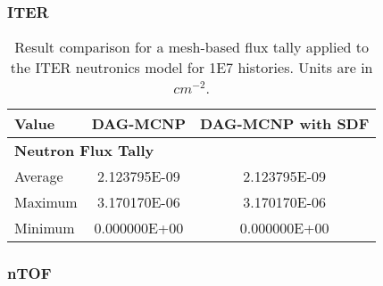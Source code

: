  \subsubsection{ITER}
  
  \begin{table}[H]
    \small
    \begin{center}
      \begin{tabular}{lcc}
        \toprule
        Value   & DAG-MCNP     & DAG-MCNP with SDF      \\
        \toprule
        \multicolumn{3}{l}{\textbf{Neutron Flux Tally}} \\
        Average & 2.123795E-09 & 2.123795E-09           \\
        Maximum & 3.170170E-06 & 3.170170E-06           \\
        Minimum & 0.000000E+00 & 0.000000E+00           \\
        \bottomrule
      \end{tabular}
    \end{center}
    \caption[Flux tally results in the ITER model for various DAG-MCNP
      implementations.]{Result comparison for a mesh-based flux tally applied to
      the ITER neutronics model for \num{1E7} histories. Units are in $cm^{-2}$.}
  \end{table}
  
  
  \subsubsection{nTOF}
  
